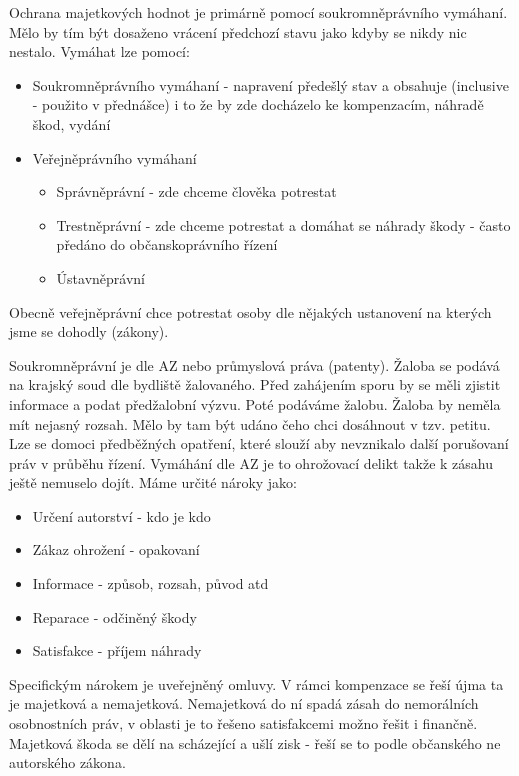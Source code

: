 \documentclass[12pt,a4paper,czech]{article}
\begin{document}
Ochrana majetkových hodnot je primárně pomocí soukromněprávního vymáhaní. Mělo by tím být dosaženo vrácení předchozí stavu jako kdyby se nikdy nic nestalo.\newline
Vymáhat lze pomocí:
\begin{itemize}
    \item Soukromněprávního vymáhaní - napravení předešlý stav a obsahuje (inclusive - použito v přednášce) i to že by zde docházelo ke kompenzacím, náhradě škod, vydání
    \item Veřejněprávního vymáhaní
    \begin{itemize}
        \item Správněprávní - zde chceme člověka potrestat 
        \item Trestněprávní - zde chceme potrestat a domáhat se náhrady škody - často předáno do občanskoprávního řízení
        \item Ústavněprávní
    \end{itemize}
\end{itemize}

Obecně veřejněprávní chce potrestat osoby dle nějakých ustanovení na kterých jsme se dohodly (zákony).

Soukromněprávní je dle AZ nebo průmyslová práva (patenty). Žaloba se podává na krajský soud dle bydliště žalovaného. Před zahájením sporu by se měli zjistit informace a podat předžalobní výzvu. Poté podáváme žalobu. Žaloba by neměla mít nejasný rozsah. Mělo by tam být udáno čeho chci dosáhnout v tzv. petitu. Lze se domoci předběžných opatření, které slouží aby nevznikalo další porušovaní práv v průběhu řízení. Vymáhání dle AZ je to ohrožovací delikt takže k zásahu ještě nemuselo dojít. Máme určité nároky jako:
\begin{itemize}
    \item  Určení autorství - kdo je kdo
    \item Zákaz ohrožení - opakovaní
    \item Informace - způsob, rozsah, původ atd
    \item Reparace - odčiněný škody
    \item Satisfakce - příjem náhrady
\end{itemize}
Specifickým nárokem je uveřejněný omluvy. V rámci kompenzace se řeší újma ta je majetková a nemajetková. Nemajetková do ní spadá zásah do nemorálních osobnostních práv, v oblasti je to řešeno satisfakcemi možno řešit i finančně. Majetková škoda se dělí na scházející a ušlí zisk - řeší se to podle občanského ne autorského zákona.
\end{document}
